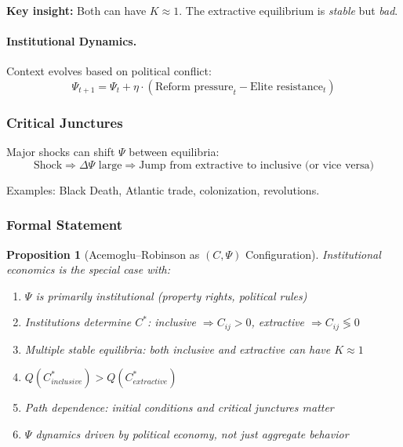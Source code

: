 \documentclass[12pt,a4paper]{article}
\newtheorem{proposition}[theorem]{Proposition}
\begin{document}
\textbf{Key insight:} Both can have $K \approx 1$.
The extractive equilibrium is \emph{stable} but \emph{bad}.

\paragraph{Institutional Dynamics.}
Context evolves based on political conflict:
\begin{equation}
  \Psi_{t+1} = \Psi_t + \eta \cdot (\text{Reform pressure}_t - \text{Elite resistance}_t)
\end{equation}

\subsubsection{Critical Junctures}

Major shocks can shift $\Psi$ between equilibria:
\begin{equation}
  \text{Shock} \Rightarrow \Delta \Psi \text{ large} \Rightarrow 
  \text{Jump from extractive to inclusive (or vice versa)}
\end{equation}

Examples: Black Death, Atlantic trade, colonization, revolutions.

\subsubsection{Formal Statement}

\begin{proposition}[Acemoglu--Robinson as $(C, \Psi)$ Configuration]
Institutional economics is the special case with:
\begin{enumerate}
  \item $\Psi$ is primarily institutional (property rights, political rules)
  \item Institutions determine $C^*$: inclusive $\Rightarrow C_{ij} > 0$, extractive $\Rightarrow C_{ij} \lessgtr 0$
  \item Multiple stable equilibria: both inclusive and extractive can have $K \approx 1$
  \item $Q(C^*_{inclusive}) > Q(C^*_{extractive})$
  \item Path dependence: initial conditions and critical junctures matter
  \item $\Psi$ dynamics driven by political economy, not just aggregate behavior
\end{enumerate}
\end{proposition}
\end{document}
